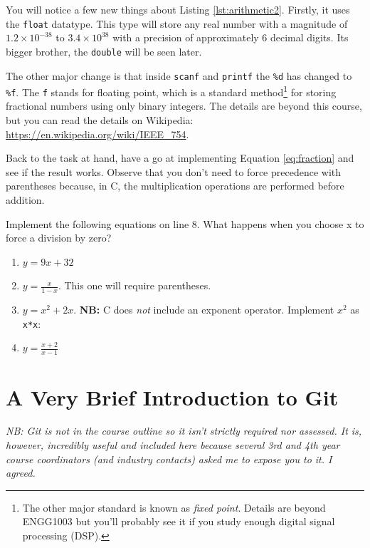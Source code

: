 \documentclass{lab}
\begin{document}
You will notice a few new things about Listing \ref{lst:arithmetic2}. Firstly, it uses the \texttt{float} datatype. This type will store any real number with a magnitude of $1.2 \times 10^{-38}$ to $3.4 \times 10^{38}$ with a precision of approximately 6 decimal digits. Its bigger brother, the \texttt{double} will be seen later.

The other major change is that inside \texttt{scanf} and \texttt{printf} the \texttt{\%d} has changed to \texttt{\%f}. The \texttt{f} stands for floating point, which is a standard method\footnote{The other major standard is known as \textit{fixed point}. Details are beyond ENGG1003 but you'll probably see it if you study enough digital signal processing (DSP).} for storing fractional numbers using only binary integers. The details are beyond this course, but you can read the details on Wikipedia: \url{https://en.wikipedia.org/wiki/IEEE_754}.

Back to the task at hand, have a go at implementing Equation \ref{eq:fraction} and see if the result works. Observe that you don't need to force precedence with parentheses because, in C, the multiplication operations are performed before addition.

\pagebreak

\begin{task}{}{}
Implement the following equations on line 8. What happens when you choose x to force a division by zero?

\begin{enumerate}
\item $y = 9x + 32$
\item $y = \frac{x}{1 - x}$.  This one will require parentheses.
\item $y = x^2 + 2x$. \textbf{NB:} C does \textit{not} include an exponent operator. Implement $x^2$ as \texttt{x*x}:
\item $y = \frac{x + 2}{x - 1}$
\end{enumerate}
\end{task}
\pagebreak
\section{A Very Brief Introduction to Git}

\textit{NB: Git is not in the course outline so it isn't strictly required nor assessed. It is, however, incredibly useful and included here because several 3rd and 4th year course coordinators (and industry contacts) asked me to expose you to it. I agreed.}
\end{document}
